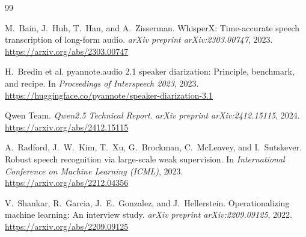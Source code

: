 \cleardoublepage
{}
\renewcommand{\bibname}{Tài liệu tham khảo}

\begin{thebibliography}{99}

M.~Bain, J.~Huh, T.~Han, and A.~Zisserman.
\newblock WhisperX: Time-accurate speech transcription of long-form audio.
\newblock \textit{arXiv preprint arXiv:2303.00747}, 2023.
\newblock \url{https://arxiv.org/abs/2303.00747}

H.~Bredin et al.
\newblock pyannote.audio 2.1 speaker diarization: Principle, benchmark, and recipe.
\newblock In \textit{Proceedings of Interspeech 2023}, 2023.
\newblock \url{https://huggingface.co/pyannote/speaker-diarization-3.1}

Qwen Team.
\newblock \textit{Qwen2.5 Technical Report}.
\newblock \textit{arXiv preprint arXiv:2412.15115}, 2024.
\newblock \url{https://arxiv.org/abs/2412.15115}

A.~Radford, J.~W.~Kim, T.~Xu, G.~Brockman, C.~McLeavey, and I.~Sutskever.
\newblock Robust speech recognition via large-scale weak supervision.
\newblock In \textit{International Conference on Machine Learning (ICML)}, 2023.
\newblock \url{https://arxiv.org/abs/2212.04356}

V.~Shankar, R.~Garcia, J.~E.~Gonzalez, and J.~Hellerstein.
\newblock Operationalizing machine learning: An interview study.
\newblock \textit{arXiv preprint arXiv:2209.09125}, 2022.
\newblock \url{https://arxiv.org/abs/2209.09125}

\end{thebibliography}
